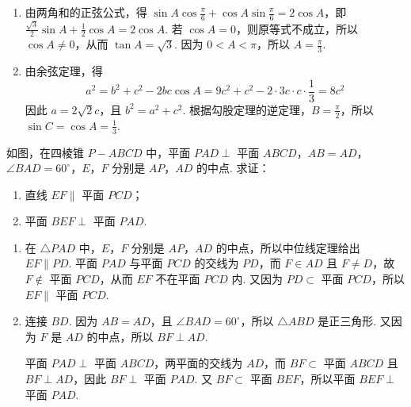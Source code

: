 \begin{solution}
\begin{enumerate}
\item 由两角和的正弦公式，得
\(\sin A\cos\frac{\pi}{6}+\cos A\sin\frac{\pi}{6}=2\cos A\)，即
\(\frac{\sqrt{3}}{2}\sin A+\frac{1}{2}\cos A=2\cos A\).
若 \(\cos A=0\)，则原等式不成立，所以 \(\cos A\neq0\)，从而
\(\tan A=\sqrt{3}\). 因为 \(0<A<\pi\)，所以 \(A=\frac{\pi}{3}\).

\item 由余弦定理，得
\[
a^2=b^2+c^2-2bc\cos A=9c^2+c^2-2\cdot3c\cdot c\cdot\frac{1}{3}=8c^2
\]
因此 \(a=2\sqrt{2}c\)，且 \(b^2=a^2+c^2\). 根据勾股定理的逆定理，\(B=\frac{\pi}{2}\)，所以
\(\sin C=\cos A=\frac{1}{3}\).
\end{enumerate}
\end{solution}

\begin{problem}
如图，在四棱锥 \(P-ABCD\) 中，平面 \(PAD\perp\) 平面 \(ABCD\)，\(AB=AD\)，\(\angle BAD=60^\circ\)，\(E\)，\(F\) 分别是 \(AP\)，\(AD\) 的中点. 求证：
\begin{enumerate}
\item 直线 \(EF\parallel\) 平面 \(PCD\)；
\item 平面 \(BEF\perp\) 平面 \(PAD\).
\end{enumerate}
\end{problem}

\begin{solution}
\begin{enumerate}
\item 在 \(\triangle PAD\) 中，\(E\)，\(F\) 分别是 \(AP\)，\(AD\) 的中点，所以中位线定理给出 \(EF\parallel PD\). 平面 \(PAD\) 与平面 \(PCD\) 的交线为 \(PD\)，而 \(F\in AD\) 且 \(F\neq D\)，故 \(F\notin\) 平面 \(PCD\)，从而 \(EF\) 不在平面 \(PCD\) 内. 又因为 \(PD\subset\) 平面 \(PCD\)，所以 \(EF\parallel\) 平面 \(PCD\).

\item 连接 \(BD\). 因为 \(AB=AD\)，且 \(\angle BAD=60^\circ\)，所以 \(\triangle ABD\) 是正三角形. 又因为 \(F\) 是 \(AD\) 的中点，所以 \(BF\perp AD\).

平面 \(PAD\perp\) 平面 \(ABCD\)，两平面的交线为 \(AD\)，而 \(BF\subset\) 平面 \(ABCD\) 且 \(BF\perp AD\)，因此 \(BF\perp\) 平面 \(PAD\). 又 \(BF\subset\) 平面 \(BEF\)，所以平面 \(BEF\perp\) 平面 \(PAD\).
\end{enumerate}
\end{solution}

